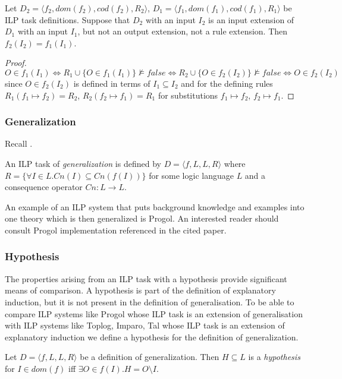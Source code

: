 \begin{proposition}
Let $D_2=\langle f_2, dom(f_2), cod(f_2), R_2 \rangle$,
$D_1=\langle f_1, dom(f_1), cod(f_1), R_1 \rangle$ be ILP task definitions. Suppose that $D_2$ with an input $I_2$ is an input extension of $D_1$ with an input $I_1$, but not an output extension, not a rule extension. Then $f_2(I_2)=f_1(I_1)$.
\end{proposition}

\begin{proof}
$O \in f_1(I_1) \iff R_1 \cup \{O \in f_1(I_1)\} \not\models false \iff  R_2 \cup \{O \in f_2(I_2)\} \not\models false \iff O \in f_2(I_2)$ since $O \in f_2(I_2)$ is defined in terms of $I_1 \subseteq I_2$ and for the defining rules $R_1(f_1 \mapsto f_2) = R_2$, $R_2(f_2 \mapsto f_1)=R_1$ for substitutions $f_1 \mapsto f_2$, $f_2 \mapsto f_1$.
\end{proof}

\subsubsection{Generalization}
Recall .
\begin{defn}
An ILP task of \emph{generalization} is defined by $D=\langle f, L, L, R \rangle$ where $R=\{\forall I \in L. Cn(I) \subseteq Cn(f(I))\}$ for some logic language $L$ and a consequence operator $Cn:L \to L$.
\end{defn}

An example of an ILP system that puts background knowledge and examples into one theory which is then generalized is Progol\cite{muggleton1995inverse}. An interested reader should consult Progol implementation referenced in the cited paper.

\subsubsection{Hypothesis}
The properties arising from an ILP task with a hypothesis provide significant means of comparison. A hypothesis is part of the definition of explanatory induction, but it is not present in the definition of generalisation. To be able to compare ILP systems like Progol whose ILP task is an extension of generalisation with ILP systems like Toplog, Imparo, Tal whose ILP task is an extension of explanatory induction we define a hypothesis for the definition of generalization.

\begin{defn}
Let $D=\langle f, L, L, R \rangle$ be a definition of generalization.
Then $H \subseteq L$ is a \emph{hypothesis} for $I \in dom(f)$ iff $\exists O \in f(I). H=O \setminus I$.
\end{defn}

